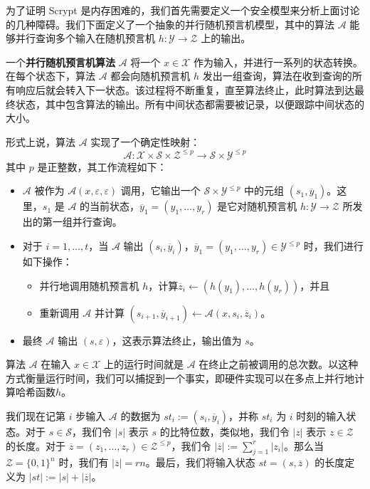 \begin{snote}
为了证明 Scrypt 是内存困难的，我们首先需要定义一个安全模型来分析上面讨论的几种障碍。我们下面定义了一个抽象的并行随机预言机模型，其中的算法 $\mathcal{A}$ 能够并行查询多个输入在随机预言机 $h:\mathcal{Y}\to\mathcal{Z}$ 上的输出。

一个\textbf{并行随机预言机算法} $\mathcal{A}$ 将一个 $x\in\mathcal{X}$ 作为输入，并进行一系列的状态转换。在每个状态下，算法 $\mathcal{A}$ 都会向随机预言机 $h$ 发出一组查询，算法在收到查询的所有响应后就会转入下一状态。该过程将不断重复，直至算法终止，此时算法到达最终状态，其中包含算法的输出。所有中间状态都需要被记录，以便跟踪中间状态的大小。

形式上说，算法 $\mathcal{A}$ 实现了一个确定性映射：
$$\mathcal{A}:\mathcal{X}\times\mathcal{S}\times\mathcal{Z}^{\leq p}\to\mathcal{S}\times\mathcal{Y}^{\leq p}$$
其中 $p$ 是正整数，其工作流程如下：
\begin{itemize}
	\item $\mathcal{A}$ 被作为 $\mathcal{A}(x,\varepsilon,\varepsilon)$ 调用，它输出一个 $\mathcal{S}\times\mathcal{Y}^{\leq p}$ 中的元组 $(s_1,\overline y_1)$。这里，$s_1$ 是 $\mathcal{A}$ 的当前状态，$\overline y_1=(y_1,\dots,y_r)$ 是它对随机预言机 $h:\mathcal{Y}\to\mathcal{Z}$ 所发出的第一组并行查询。
	\item 对于 $i=1,\dots,t$，当 $\mathcal{A}$ 输出 $(s_i,\overline y_i)$，$\overline y_1=(y_1,\dots,y_r)\in\mathcal{Y}^{\leq p}$ 时，我们进行如下操作：
	\begin{itemize}
	  \item 并行地调用随机预言机 $h$，计算$\overline z_i\leftarrow (h(y_1),\dots,h(y_r))$，并且
	  \item 重新调用 $\mathcal{A}$ 并计算 $(s_{i+1},\overline y_{i+1})\leftarrow \mathcal{A}(x,s_i,\overline z_i)$。
	\end{itemize}
	\item 最终 $\mathcal{A}$ 输出 $(s,\varepsilon)$，这表示算法终止，输出值为 $s$。
\end{itemize}

算法 $\mathcal{A}$ 在输入 $x\in\mathcal{X}$ 上的运行时间就是 $\mathcal{A}$ 在终止之前被调用的总次数。以这种方式衡量运行时间，我们可以捕捉到一个事实，即硬件实现可以在多点上并行地计算哈希函数$h$。

我们现在记第 $i$ 步输入 $\mathcal{A}$ 的数据为 $st_i:=(s_i,\overline y_i)$，并称 $st_i$ 为 $i$ 时刻的输入状态。对于 $s\in\mathcal{S}$，我们令 $|s|$ 表示 $s$ 的比特位数，类似地，我们令 $|z|$ 表示 $z\in\mathcal{Z}$ 的长度。对于 $\overline z=(z_1,\dots,z_r)\in\mathcal{Z}^{\leq p}$，我们令 $|\overline z|:=\sum_{j=1}^r|z_i|$。那么当 $\mathcal{Z}=\{0,1\}^n$ 时，我们有 $|\overline z|=rn$。最后，我们将输入状态 $st=(s,\overline z)$ 的长度定义为 $|st|:=|s|+|\overline z|$。
\end{snote}

